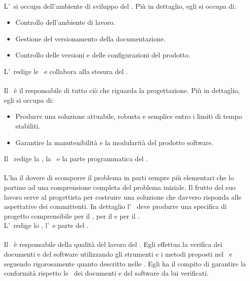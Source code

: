 \paragraph{\Am}
L'\Am\ si occupa dell'ambiente di sviluppo del . Più in dettaglio, egli si occupa di:
\begin{itemize}
  \item Controllo dell'ambiente di lavoro.
  \item Gestione del versionamento della documentazione.
  \item Controllo delle versioni e delle configurazioni del prodotto.
\end{itemize}
L'\Am\ redige le \NdP\ e collabora alla stesura del
\PdP.

\paragraph{\Prog} 
Il \Prog\ è il responsabile di tutto ciò che riguarda la progettazione.
Più in dettaglio, egli si occupa di:
\begin{itemize}
  \item Produrre una soluzione attuabile, robusta e semplice entro i limiti di
  tempo stabiliti.
  \item Garantire la manutenibilità e la modularità del prodotto software.
\end{itemize}
Il \Prog\ redige la \studioDiFattibilita, la \DDP\ e la parte
programmatica del \PdQ.

\paragraph{\An}
L'\An ha il dovere di scomporre il problema in parti sempre più elementari che lo portino ad una comprensione completa del problema iniziale.
Il frutto del suo lavoro serve al progettista per costruire una soluzione che davvero risponda alle aspettative dei committenti.
In dettaglio l' \An\ deve produrre una specifica di progetto comprensibile per il , per il  e per il \Prog. \\
L'\An\ redige lo \SdF, l'\AdR\ e parte del \PdQ.

\paragraph{\Ver}
Il \Ver\ è responsabile della qualità del lavoro del .
Egli effettua la verifica dei documenti e del software utilizzando gli strumenti e i metodi proposti nel
\PdQ\ e seguendo rigorosamente quanto descritto nelle \NdP.
Egli ha il compito di garantire la conformità rispetto le \NdP\ dei documenti e del software da lui verificati.

